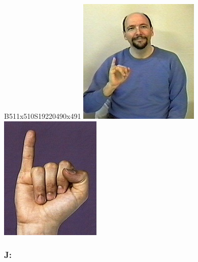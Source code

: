 \documentclass{article}
\begin{document}
B511x510S19220490x491
\includegraphics[scale=0.5]{images/i.jpg}
\includegraphics[scale=0.5]{images/i1.jpg}

\subsubsection{J:}
\end{document}
